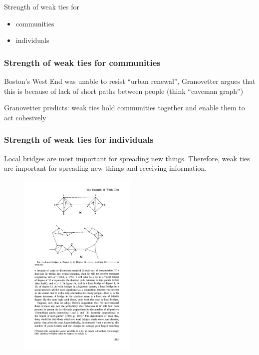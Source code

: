 \documentclass[aspectratio=169]{beamer}
\begin{document}
\begin{frame}

Strength of weak ties for
\begin{itemize}
\item communities
\item individuals
\end{itemize}

\end{frame}
\begin{frame}
\frametitle{Strength of weak ties for communities}

Boston's West End was unable to resist ``urban renewal'', Granovetter argues that this is because of lack of short paths between people (think ``caveman graph'')\\

\vfill

Granovetter predicts: weak ties hold communities together and enable them to act cohesively


\end{frame}
\begin{frame}
\frametitle{Strength of weak ties for individuals}

Local bridges are most important for spreading new things.  Therefore, weak ties are important for spreading new things and receiving information.

\begin{figure}
\includegraphics[width=0.5\textwidth]{figures/granovetter_strength_1973_fig2}
\end{figure}

\end{frame}
\end{document}
